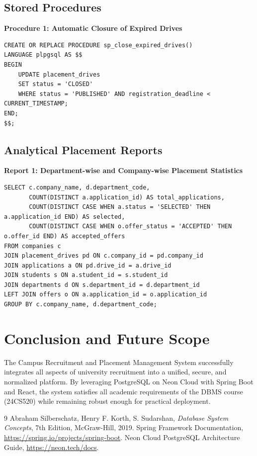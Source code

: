 \documentclass[12pt,a4paper]{report}
\begin{document}
\section{Stored Procedures}
\textbf{Procedure 1: Automatic Closure of Expired Drives}
\begin{lstlisting}
CREATE OR REPLACE PROCEDURE sp_close_expired_drives()
LANGUAGE plpgsql AS $$
BEGIN
    UPDATE placement_drives
    SET status = 'CLOSED'
    WHERE status = 'PUBLISHED' AND registration_deadline < CURRENT_TIMESTAMP;
END;
$$;
\end{lstlisting}

\section{Analytical Placement Reports}
\textbf{Report 1: Department-wise and Company-wise Placement Statistics}
\begin{lstlisting}
SELECT c.company_name, d.department_code,
       COUNT(DISTINCT a.application_id) AS total_applications,
       COUNT(DISTINCT CASE WHEN a.status = 'SELECTED' THEN a.application_id END) AS selected,
       COUNT(DISTINCT CASE WHEN o.offer_status = 'ACCEPTED' THEN o.offer_id END) AS accepted_offers
FROM companies c
JOIN placement_drives pd ON c.company_id = pd.company_id
JOIN applications a ON pd.drive_id = a.drive_id
JOIN students s ON a.student_id = s.student_id
JOIN departments d ON s.department_id = d.department_id
LEFT JOIN offers o ON a.application_id = o.application_id
GROUP BY c.company_name, d.department_code;
\end{lstlisting}

\chapter{Conclusion and Future Scope}
The Campus Recruitment and Placement Management System successfully integrates all aspects of university recruitment into a unified, secure, and normalized platform. By leveraging PostgreSQL on Neon Cloud with Spring Boot and React, the system satisfies all academic requirements of the DBMS course (24CS520) while remaining robust enough for practical deployment.

\begin{thebibliography}{9}
Abraham Silberschatz, Henry F. Korth, S. Sudarshan,
\textit{Database System Concepts}, 7th Edition, McGraw-Hill, 2019.
Spring Framework Documentation, \url{https://spring.io/projects/spring-boot}.
Neon Cloud PostgreSQL Architecture Guide, \url{https://neon.tech/docs}.
\end{thebibliography}
\end{document}

